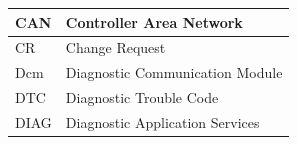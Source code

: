 \begin{longtable}{|l|l|}
\begin{minipage}{0.31\linewidth}\raggedright\vspace{.75ex}CAN\vspace{.75ex}\end{minipage} & \begin{minipage}{0.63\linewidth}\raggedright\vspace{.75ex}Controller Area Network\vspace{.75ex}\end{minipage}\\\hline
\begin{minipage}{0.31\linewidth}\raggedright\vspace{.75ex}CR\vspace{.75ex}\end{minipage} & \begin{minipage}{0.63\linewidth}\raggedright\vspace{.75ex}Change Request\vspace{.75ex}\end{minipage}\\\hline
\begin{minipage}{0.31\linewidth}\raggedright\vspace{.75ex}Dcm\vspace{.75ex}\end{minipage} & \begin{minipage}{0.63\linewidth}\raggedright\vspace{.75ex}Diagnostic Communication Module\vspace{.75ex}\end{minipage}\\\hline
\begin{minipage}{0.31\linewidth}\raggedright\vspace{.75ex}DTC\vspace{.75ex}\end{minipage} & \begin{minipage}{0.63\linewidth}\raggedright\vspace{.75ex}Diagnostic Trouble Code\vspace{.75ex}\end{minipage}\\\hline
\begin{minipage}{0.31\linewidth}\raggedright\vspace{.75ex}DIAG\vspace{.75ex}\end{minipage} & \begin{minipage}{0.63\linewidth}\raggedright\vspace{.75ex}Diagnostic Application Services\vspace{.75ex}\end{minipage}\\\hline

\end{longtable}
